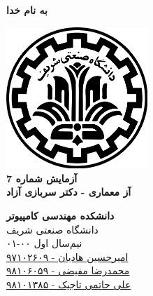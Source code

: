 \documentclass{article}
\begin{document}
\begin{titlepage}
	\begin{center}
		\textbf{ \Huge{به نام خدا}}
	
		\vspace{0.2cm}		
		\includegraphics[width=0.4\textwidth]{sharif.png}\\
		\vspace{0.2cm}
		\textbf{ \Huge{آزمایش شماره 7}}\\
		\vspace{0.25cm}
		\textbf{ \Large{آز معماری - دکتر سربازی آزاد}}
		\vspace{0.2cm}
		
		
		\large \textbf{دانشکده مهندسی کامپیوتر}\\\vspace{0.1cm}
		\large   دانشگاه صنعتی شریف\\\vspace{0.2cm}
		\large   ﻧﯿﻢ‌سال اول ۰۰-۰۱ \\\vspace{0.10cm}
		\large{\href{mailto:a.h.hadian@gmail.com}{امیرحسین هادیان - ۹۷۱۰۲۶۰۹}}\\
		\large{\href{mailto:mofayezi.m@gmail.com}{محمدرضا مفیضی - ۹۸۱۰۶۰۵۹}}\\
		\large{\href{mailto:a.hatam008@gmail.com}{علی حاتمی تاجیک - ۹۸۱۰۱۳۸۵}}\\
	\end{center}
\end{titlepage}

\newpage

\pagestyle{fancy}
\fancyhf{}
\fancyfoot{}
\setlength{\headheight}{59pt}
\cfoot{\thepage}
\end{document}
